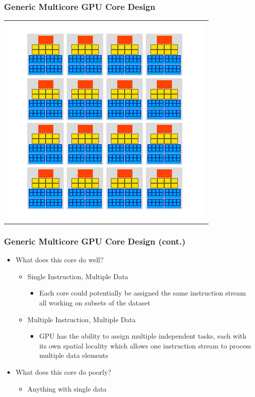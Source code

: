\documentclass{beamer}
\begin{document}
\begin{frame}
	\frametitle{Generic Multicore GPU Core Design}
	\begin{tabular}{c}
		\includegraphics[width=.75\textwidth]{GPU-Design---multiple-cores.jpg}
	\end{tabular}
\end{frame}

\begin{frame}
	\frametitle{Generic Multicore GPU Core Design (cont.)}
	\begin{itemize}
		\item What does this core do well?
		\begin{itemize}
			\item Single Instruction, Multiple Data
			\begin{itemize}
				\item Each core could potentially be assigned the same instruction stream all working on subsets of the dataset
			\end{itemize}
			\item Multiple Instruction, Multiple Data
			\begin{itemize}
				\item GPU has the ability to assign multiple independent tasks, each with its own spatial locality which allows one instruction stream to process multiple data elements
			\end{itemize}
		\end{itemize}
		\item What does this core do poorly?
		\begin{itemize}
			\item Anything with single data
		\end{itemize}
	\end{itemize}
\end{frame}
\end{document}
